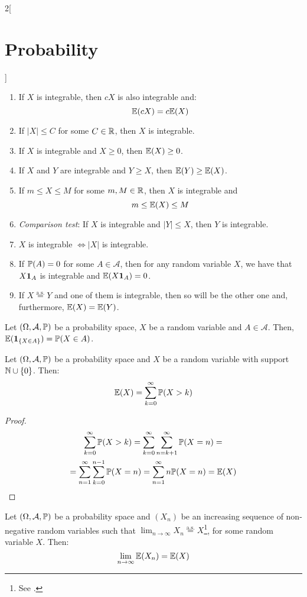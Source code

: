 \documentclass[../../../main_math.tex]{subfiles}
\begin{document}
\begin{multicols}{2}[\section{Probability}]
\begin{proposition}
\begin{enumerate}
      \item If $X$ is integrable, then $cX$ is also integrable and: $$\mathbb{E}(cX)=c\mathbb{E}(X)$$
      \item If $|X|\leq C$ for some $C\in \mathbb{R}$, then $X$ is integrable.
      \item If $X$ is integrable and $X\geq 0$, then $\mathbb{E}(X)\geq 0$.
      \item If $X$ and $Y$ are integrable and $Y\geq X$, then $\mathbb{E}(Y)\geq \mathbb{E}(X)$.
      \item If $m\leq X\leq M$ for some $m, M\in\mathbb{R}$, then $X$ is integrable and $$m\leq \mathbb{E}(X)\leq M$$
      \item \emph{Comparison test}: If $X$ is integrable and $|Y|\leq X$, then $Y$ is integrable.
      \item $X$ is integrable $\iff |X|$ is integrable.
      \item If $\mathbb{P}(A)=0$ for some $A\in\mathcal{A}$, then for any random variable $X$, we have that $X\boldsymbol{\mathrm{1}}_{A}$ is integrable and $\mathbb{E}(X\boldsymbol{\mathrm{1}}_{A})=0$.
      \item If $X\overset{\text{a.s.}}{=}Y$ and one of them is integrable, then so will be the other one and, furthermore, $\mathbb{E}(X)=\mathbb{E}(Y)$.
    \end{enumerate}
  \end{proposition}
  \begin{corollary}
    Let $(\Omega,\mathcal{A},\mathbb{P})$ be a probability space, $X$ be a random variable and $A\in\mathcal{A}$. Then, $\mathbb{E}(\boldsymbol{\mathrm{1}}_{\{X\in A\}})=\mathbb{P}(X\in A)$.
  \end{corollary}
  \begin{proposition}
    Let $(\Omega,\mathcal{A},\mathbb{P})$ be a probability space and $X$ be a random variable with support $\mathbb{N}\cup\{0\}$. Then: $$\mathbb{E}(X)=\sum_{k=0}^\infty\mathbb{P}(X>k)$$
  \end{proposition}
  \begin{proof}
    \begin{multline*}
      \sum_{k=0}^\infty\mathbb{P}(X>k)=\sum_{k=0}^\infty\sum_{n=k+1}^{\infty}\mathbb{P}(X=n)=\\=\sum_{n=1}^\infty\sum_{k=0}^{n-1}\mathbb{P}(X=n)=\sum_{n=1}^\infty n\mathbb{P}(X=n)= \mathbb{E}(X)
    \end{multline*}
  \end{proof}
  \begin{theorem}\label{P:monotone}
    Let $(\Omega,\mathcal{A},\mathbb{P})$ be a probability space and $(X_n)$ be an increasing sequence of non-negative random variables such that $\displaystyle\lim_{n\to\infty}X_n\overset{\text{a.s.}}{=}X$\footnote{See .}, for some random variable $X$. Then: $$\lim_{n\to\infty} \mathbb{E}(X_n)=\mathbb{E}(X)$$

\end{theorem}
\end{multicols}
\end{document}
